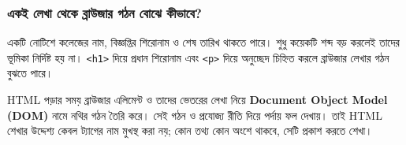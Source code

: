 \subsubsection{একই লেখা থেকে ব্রাউজার গঠন বোঝে কীভাবে?}
একটি নোটিশে কলেজের নাম, বিজ্ঞপ্তির শিরোনাম ও শেষ তারিখ থাকতে পারে। শুধু কয়েকটি শব্দ বড় করলেই তাদের ভূমিকা নির্দিষ্ট হয় না। \texttt{<h1>} দিয়ে প্রধান শিরোনাম এবং \texttt{<p>} দিয়ে অনুচ্ছেদ চিহ্নিত করলে ব্রাউজার লেখার গঠন বুঝতে পারে।

HTML পড়ার সময় ব্রাউজার এলিমেন্ট ও তাদের ভেতরের লেখা নিয়ে \textbf{Document Object Model (DOM)} নামে নথির গঠন তৈরি করে। সেই গঠন ও প্রযোজ্য রীতি দিয়ে পর্দায় ফল দেখায়। তাই HTML শেখার উদ্দেশ্য কেবল ট্যাগের নাম মুখস্থ করা নয়; কোন তথ্য কোন অংশে থাকবে, সেটি প্রকাশ করতে শেখা।

